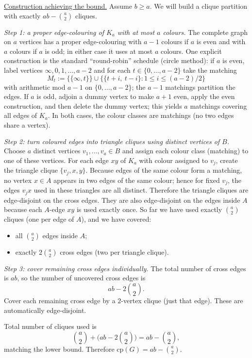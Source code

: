 \underline{Construction achieving the bound.}
Assume $b\ge a$. We will build a clique partition with exactly $ab-\binom{a}{2}$ cliques.

\emph{Step 1: a proper edge-colouring of $K_a$ with at most $a$ colours.}
The complete graph on $a$ vertices has a proper edge-colouring with $a-1$ colours if $a$ is even and with $a$ colours if $a$ is odd; in either case it uses at most $a$ colours. One explicit construction is the standard ``round-robin'' schedule (circle method): if $a$ is even, label vertices $\infty,0,1,\dots,a-2$ and for each $t\in\{0,\dots,a-2\}$ take the matching
\[
M_t:=\{\{\infty,t\}\}\cup\{\{t+i,\ t-i\}:1\le i\le (a-2)/2\}
\]
with arithmetic mod $a-1$ on $\{0,\dots,a-2\}$; the $a-1$ matchings partition the edges. If $a$ is odd, adjoin a dummy vertex to make $a+1$ even, apply the even construction, and then delete the dummy vertex; this yields $a$ matchings covering all edges of $K_a$.
In both cases, the colour classes are matchings (no two edges share a vertex).

\emph{Step 2: turn coloured edges into triangle cliques using distinct vertices of $B$.}
Choose $a$ distinct vertices $v_1,\dots,v_a\in B$ and assign each colour class (matching) to one of these vertices.
For each edge $xy$ of $K_a$ with colour assigned to $v_j$, create the triangle clique $\{v_j,x,y\}$.
Because edges of the same colour form a matching, no vertex $x\in A$ appears in two edges of the same colour; hence for fixed $v_j$, the edges $v_jx$ used in these triangles are all distinct.
Therefore the triangle cliques are edge-disjoint on the cross edges.
They are also edge-disjoint on the edges inside $A$ because each $A$-edge $xy$ is used exactly once.
So far we have used exactly $\binom{a}{2}$ cliques (one per edge of $A$), and we have covered:
\begin{itemize}
\item all $\binom{a}{2}$ edges inside $A$;
\item exactly $2\binom{a}{2}$ cross edges (two per triangle clique).
\end{itemize}

\emph{Step 3: cover remaining cross edges individually.}
The total number of cross edges is $ab$, so the number of uncovered cross edges is
\[
ab-2\binom{a}{2}.
\]
Cover each remaining cross edge by a $2$-vertex clique (just that edge).
These are automatically edge-disjoint.

Total number of cliques used is
\[
\binom{a}{2} + \bigl(ab-2\binom{a}{2}\bigr) = ab-\binom{a}{2},
\]
matching the lower bound. Therefore $\mathrm{cp}(G)=ab-\binom{a}{2}$.

